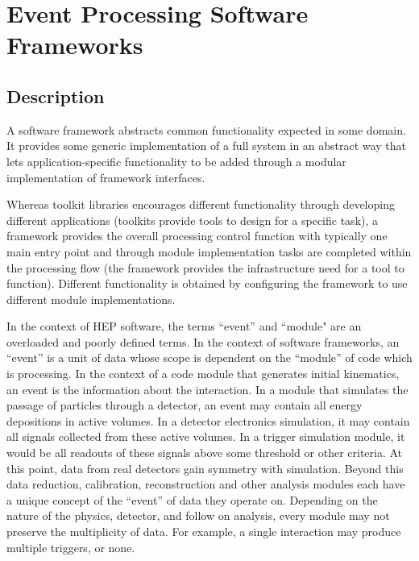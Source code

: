 \section{Event Processing Software Frameworks}

\subsection{Description}

A software framework abstracts common functionality expected in some
domain.  It provides some generic implementation of a full system in
an abstract way that lets application-specific functionality to be
added through a modular implementation of framework interfaces.

Whereas toolkit libraries encourages different functionality through
developing different applications (toolkits provide tools to design for a specific task), a framework provides the overall
processing control function with typically one main entry point and through module implementation tasks are completed within the processing flow (the framework provides the infrastructure need for a tool to function).
Different functionality is obtained by configuring the framework to
use different module implementations.

In the context of HEP software, the terms ``event'' and ``module" are an overloaded and poorly defined terms.
In the context of software frameworks, an ``event'' is a unit of data whose scope is dependent
on the ``module'' of code which is processing.  In the context of a
code module that generates initial kinematics, an event is the
information about the interaction.  In a module that simulates the
passage of particles through a detector, an event may contain all
energy depositions in active volumes.  In a detector electronics
simulation, it may contain all signals collected from these active
volumes.  In a trigger simulation module, it would be all readouts of
these signals above some threshold or other criteria.  At this point,
data from real detectors gain symmetry with simulation.  Beyond this
data reduction, calibration, reconstruction and other analysis modules
each have a unique concept of the ``event'' of data they operate on.
Depending on the nature of the physics, detector, and follow on
analysis, every module may not preserve the multiplicity of data.  For
example, a single interaction may produce multiple triggers, or none.

